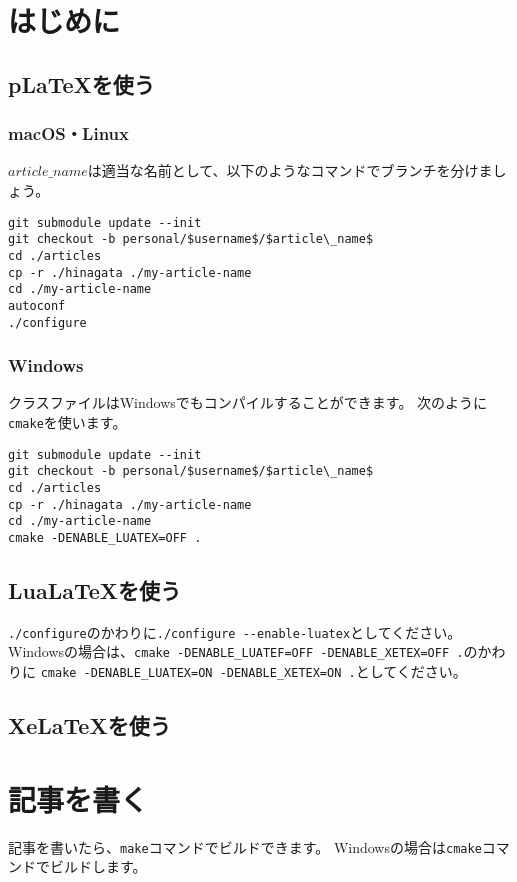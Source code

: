 \documentclass{word}
\begin{document}
\makearticletitle
\section{はじめに}
\subsection{p\LaTeX を使う}

\subsubsection{macOS・Linux}

$article\_name$は適当な名前として、以下のようなコマンドでブランチを分けましょう。

\begin{lstlisting}[mathescape]
git submodule update --init
git checkout -b personal/$username$/$article\_name$
cd ./articles
cp -r ./hinagata ./my-article-name
cd ./my-article-name
autoconf
./configure
\end{lstlisting}

\subsubsection{Windows}

\WORD クラスファイルはWindowsでもコンパイルすることができます。
次のように\lstinline|cmake|を使います。

\begin{lstlisting}[mathescape]
git submodule update --init
git checkout -b personal/$username$/$article\_name$
cd ./articles
cp -r ./hinagata ./my-article-name
cd ./my-article-name
cmake -DENABLE_LUATEX=OFF .
\end{lstlisting}
\subsection{Lua\LaTeX を使う}
\lstinline|./configure|のかわりに\lstinline|./configure --enable-luatex|としてください。
Windowsの場合は、\lstinline|cmake -DENABLE_LUATEF=OFF -DENABLE_XETEX=OFF .|のかわりに
\lstinline|cmake -DENABLE_LUATEX=ON -DENABLE_XETEX=ON .|としてください。

\subsection{Xe\LaTeX を使う}

\section{記事を書く}
記事を書いたら、\lstinline|make|コマンドでビルドできます。
Windowsの場合は\lstinline|cmake|コマンドでビルドします。
\end{document}
